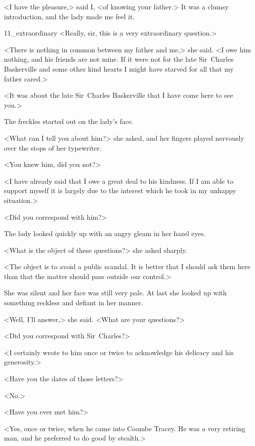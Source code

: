 <I have the pleasure,> said I, <of knowing your father.> It was a clumsy introduction, and the lady made me feel it.


	\begin{bwbigpic}
			[1.0]  
		{11_extraordinary}
		{<Really, sir, this is a very extraordinary question.>}
	\end{bwbigpic}

<There is nothing in common between my father and me,> she said. <I owe him nothing, and his friends are not mine. If it were not for the late Sir~Charles Baskerville and some other kind hearts I might have starved for all that my father cared.>

<It was about the late Sir~Charles Baskerville that I have come here to see you.>

The freckles started out on the lady's face.

<What can I tell you about him?> she asked, and her fingers played nervously over the stops of her typewriter.

<You knew him, did you not?>

<I have already said that I owe a great deal to his kindness. If I am able to support myself it is largely due to the interest which he took in my unhappy situation.>

<Did you correspond with him?>

The lady looked quickly up with an angry gleam in her hazel eyes.

<What is the object of these questions?> she asked sharply.

<The object is to avoid a public scandal. It is better that I should ask them here than that the matter should pass outside our control.>

She was silent and her face was still very pale. At last she looked up with something reckless and defiant in her manner.

<Well, I'll answer,> she said. <What are your questions?>

<Did you correspond with Sir~Charles?>

<I certainly wrote to him once or twice to acknowledge his delicacy and his generosity.>

<Have you the dates of those letters?>

<No.>

<Have you ever met him?>

<Yes, once or twice, when he came into Coombe Tracey. He was a very retiring man, and he preferred to do good by stealth.>

